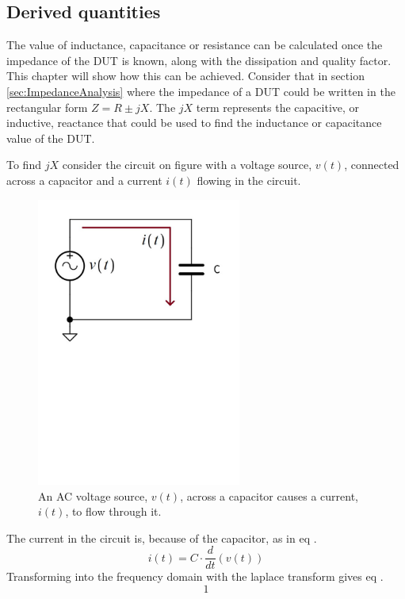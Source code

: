 \subsection{Derived quantities} \label{subsec:DerivedQuantities}
The value of inductance, capacitance or resistance can be calculated once the impedance of the DUT is known, along with the dissipation and quality factor. This chapter will show how this can be achieved. Consider that in section \ref{sec:ImpedanceAnalysis} where the impedance of a DUT could be written in the rectangular form $Z = R \pm jX$. The $jX$ term represents the capacitive, or inductive, reactance that could be used to find the inductance or capacitance value of the DUT.

To find $jX$ consider the circuit on figure  with a voltage source, $v(t)$, connected across a capacitor and a current $i(t)$ flowing in the circuit. 
\begin{figure}[H]
    \centering
    \includegraphics[clip, trim=0 400 0 0, width=0.60\textwidth]{Sections/4_TechnicalAnalysis/Figures/4_1_1_CapCircuit.pdf}
    \caption{An AC voltage source, $v(t)$, across a capacitor causes a current, $i(t)$, to flow through it.}
    \label{fig:4_1_1_CapCircuit}
\end{figure}

The current in the circuit is, because of the capacitor, as in eq .
\begin{equation}\label{eq:4_1_1_CapCurrent}
    i(t) = C\cdot\frac{d}{dt} (v(t))
\end{equation}
Transforming  into the frequency domain with the laplace transform gives eq .
\begin{equation}\label{eq:4_1_1_CapCurrent2}
    1
\end{equation}

